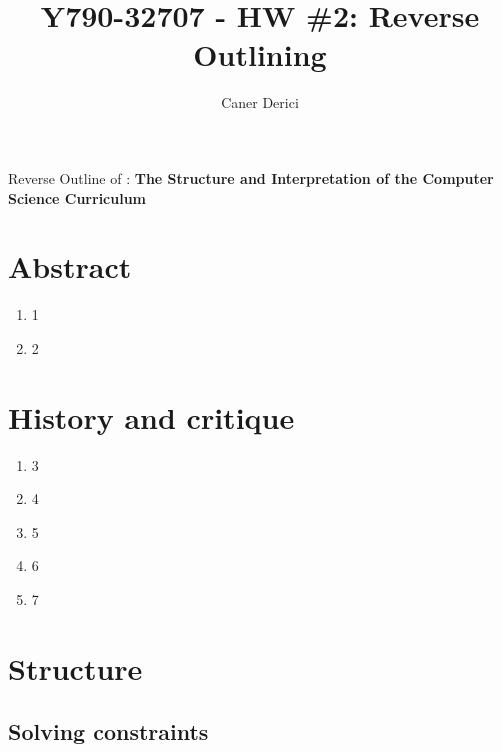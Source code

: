\documentclass{article}
\title{Y790-32707 - HW \#2: Reverse Outlining}
\author{}
\date{Caner Derici}
\begin{document}

\maketitle



\begin{center}
  Reverse Outline of : \textbf{The Structure and Interpretation of the Computer Science Curriculum}
\end{center}

\section*{Abstract}

\begin{enumerate}
\item 1
\item 2
\end{enumerate}

\section{History and critique}

\begin{enumerate}
\item 3
\item 4
\item 5
\item 6
\item 7
\end{enumerate}

\section{Structure}

\subsection{Solving constraints}
\end{document}
